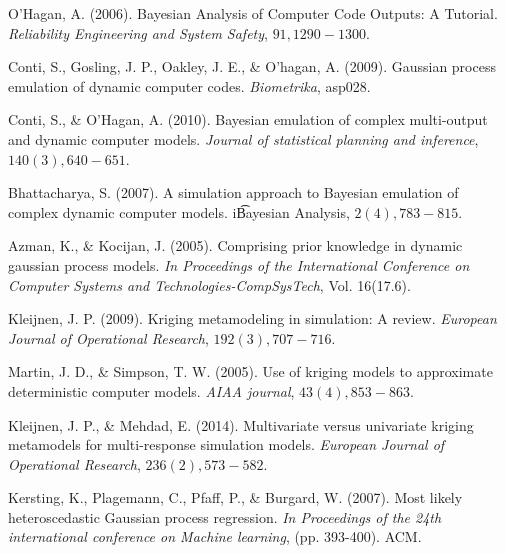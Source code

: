 \begin{thebibliography}{94}
 O'Hagan, A. (2006). Bayesian Analysis of Computer Code Outputs: A Tutorial. {\it Reliability Engineering and System Safety}, $91, 1290-1300$.

 Conti, S., Gosling, J. P., Oakley, J. E., \& O'hagan, A. (2009). Gaussian process emulation of dynamic computer codes. {\it Biometrika}, asp028.


 Conti, S., \& O’Hagan, A. (2010). Bayesian emulation of complex multi-output and dynamic computer models. {\it Journal of statistical planning and inference}, $140(3), 640-651$.

 Bhattacharya, S. (2007). A simulation approach to Bayesian emulation of complex dynamic computer models. {i\t Bayesian Analysis}, $2(4), 783-815$.


 Azman, K., \& Kocijan, J. (2005). Comprising prior knowledge in dynamic gaussian process models. {\it In Proceedings of the International Conference on Computer Systems and Technologies-CompSysTech}, Vol. 16(17.6).

 Kleijnen, J. P. (2009). Kriging metamodeling in simulation: A review. {\it European Journal of Operational Research}, $192(3), 707-716$.

 Martin, J. D., \& Simpson, T. W. (2005). Use of kriging models to approximate deterministic computer models. {\it AIAA journal}, $43(4), 853-863$.

 Kleijnen, J. P., \& Mehdad, E. (2014). Multivariate versus univariate kriging metamodels for multi-response simulation models. {\it European Journal of Operational Research}, $236(2), 573-582$.


 Kersting, K., Plagemann, C., Pfaff, P., \& Burgard, W. (2007). Most likely heteroscedastic Gaussian process regression. {\it In Proceedings of the 24th international conference on Machine learning}, (pp. 393-400). ACM.


\end{thebibliography}
